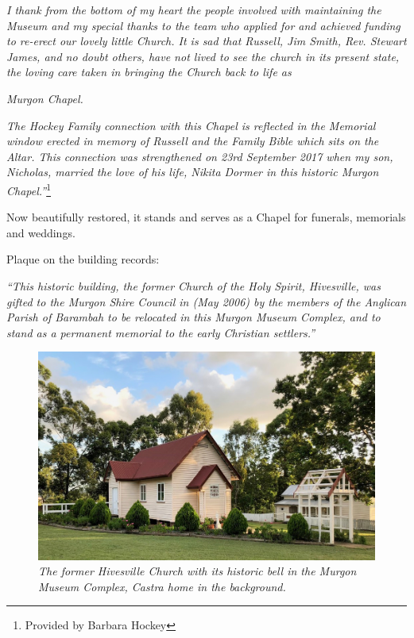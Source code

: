 \emph{I thank from the bottom of my heart the people involved with maintaining the Museum and my special thanks to the team who applied for and achieved funding to re-erect our lovely little Church. It is sad that Russell, Jim Smith, Rev. Stewart James, and no doubt others, have not lived to see the church in its present state, the loving care taken in bringing the Church back to life as}



\emph{Murgon Chapel.}



\emph{The Hockey Family connection with this Chapel is reflected in the Memorial window erected in memory of Russell and the Family Bible which sits on the Altar. This connection was strengthened on 23rd September 2017 when my son, Nicholas, married the love of his life, Nikita Dormer in this historic Murgon Chapel.''}\footnote{Provided by Barbara Hockey}


\medskip


Now beautifully restored, it stands and serves as a Chapel for funerals, memorials and weddings.



Plaque on the building records:



\emph{``This historic building, the former Church of the Holy Spirit, Hivesville, was gifted to the Murgon Shire Council in (May 2006) by the members of the Anglican Parish of Barambah to be relocated in this Murgon Museum Complex, and to stand as a permanent memorial to the early Christian settlers.''}









\begin{figure}[!htb]
\begin{center}
\includegraphics[width=1.\textwidth,center]{../images/hivesvilleChurchToday.jpg}
\caption{\itshape The former Hivesville Church with its historic bell in the Murgon Museum Complex, Castra home in the background.}
\end{center}
\end{figure}




